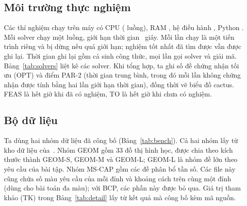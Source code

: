 \subsection{Môi trường thực nghiệm}\label{sec:setup}

Các thí nghiệm chạy trên máy có CPU \MachineCPU{} (\MachineCores{} luồng), RAM \MachineRAM, hệ điều hành \MachineOS, Python \PythonVersion. Mỗi solver chạy một luồng, giới hạn thời gian \TimeLimit~giây. \RepeatText{} Mỗi lần chạy là một tiến trình riêng và bị dừng nếu quá giới hạn; nghiệm tốt nhất đã tìm được vẫn được ghi lại. Thời gian ghi lại gồm cả sinh công thức, mọi lần gọi solver và giải mã. Bảng~\ref{tab:solvers} liệt kê các solver. Khi tổng hợp, ta ghi số đề chứng nhận tối ưu (OPT) và điểm PAR-2 (thời gian trung bình, trong đó mỗi lần không chứng nhận được tính bằng hai lần giới hạn thời gian), đồng thời vẽ biểu đồ cactus. FEAS là hết giờ khi đã có nghiệm, TO là hết giờ khi chưa có nghiệm.

\begin{table}[width=\linewidth,pos=t]
\caption{Các solver và cách gọi. ``không chạy'' nghĩa là solver không cài được trên máy thử nghiệm.}
\label{tab:solvers}
\centering\small

\end{table}

\subsection{Bộ dữ liệu}\label{sec:bench}

Ta dùng hai nhóm dữ liệu đã công bố (Bảng~\ref{tab:bench}). Cả hai nhóm lấy từ kho dữ liệu của~\citet{nguyen2026bcp}. Nhóm GEOM gồm 33 đồ thị hình học, được chia theo kích thước thành GEOM-S, GEOM-M và GEOM-L; GEOM-L là nhóm đề lớn theo yêu cầu của bài tập. Nhóm MS-CAP gồm các đề phân bổ tần số. Các file này cũng chứa số màu yêu cầu của mỗi đỉnh và khoảng cách trên cùng một đỉnh (dùng cho bài toán đa màu); với BCP, các phần này được bỏ qua. Giá trị tham khảo (TK) trong Bảng~\ref{tab:detail} lấy từ kết quả mà \citet{nguyen2026bcp} công bố kèm mã nguồn.

\begin{table}[width=\linewidth,pos=t]
\caption{Các bộ dữ liệu.}
\label{tab:bench}
\centering\small

\end{table}
